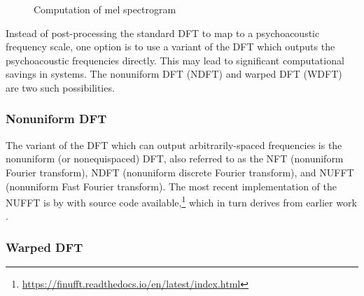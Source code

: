 \documentclass[letter,12pt,notitlepage]{article}
\begin{document}
\begin{figure}[ht]
	\centering
	\caption{Computation of mel spectrogram}
	\label{fig:melfilter}
\end{figure}

Instead of post-processing the standard DFT to map to a psychoacoustic frequency scale, one option is to use a variant of the DFT which outputs the psychoacoustic frequencies directly. This may lead to significant computational savings in systems. The nonuniform DFT (NDFT) and warped DFT (WDFT) are two such possibilities.

\subsubsection{Nonuniform DFT}

The variant of the DFT which can output arbitrarily-spaced frequencies is the nonuniform (or nonequispaced) DFT, also referred to as the NFT (nonuniform Fourier transform), NDFT (nonuniform discrete Fourier transform), and NUFFT (nonuniform Fast Fourier transform). The most recent implementation of the NUFFT is by \citet{nufft1} with source code available,\footnote{\href{https://finufft.readthedocs.io/en/latest/index.html}{https://finufft.readthedocs.io/en/latest/index.html}} which in turn derives from earlier work \cite{nufft2, nufft3}.

\subsubsection{Warped DFT}
\end{document}
